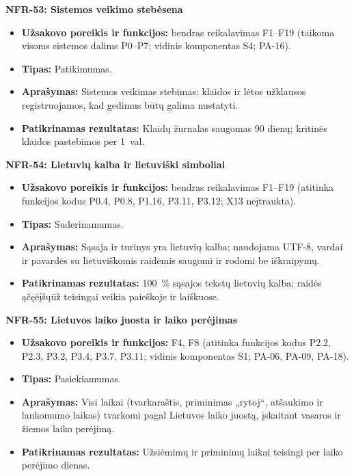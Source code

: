 \noindent\textbf{NFR-53: Sistemos veikimo stebėsena}
\begin{itemize}
    \item \textbf{Užsakovo poreikis ir funkcijos:} bendras reikalavimas F1--F19 (taikoma visoms sistemos dalims P0--P7; vidinis komponentas S4; PA-16).
    \item \textbf{Tipas:} Patikimumas.
    \item \textbf{Aprašymas:} Sistemos veikimas stebimas: klaidos ir lėtos užklausos registruojamos, kad gedimus būtų galima nustatyti.
    \item \textbf{Patikrinamas rezultatas:} Klaidų žurnalas saugomas 90 dienų; kritinės klaidos pastebimos per 1~val.
\end{itemize}

\noindent\textbf{NFR-54: Lietuvių kalba ir lietuviški simboliai}
\begin{itemize}
    \item \textbf{Užsakovo poreikis ir funkcijos:} bendras reikalavimas F1--F19 (atitinka funkcijos kodus P0.4, P0.8, P1.16, P3.11, P3.12; X13 neįtraukta).
    \item \textbf{Tipas:} Suderinamumas.
    \item \textbf{Aprašymas:} Sąsaja ir turinys yra lietuvių kalba; naudojama UTF-8, vardai ir pavardės su lietuviškomis raidėmis saugomi ir rodomi be iškraipymų.
    \item \textbf{Patikrinamas rezultatas:} 100~\% sąsajos tekstų lietuvių kalba; raidės ąčęėįšųūž teisingai veikia paieškoje ir laiškuose.
\end{itemize}

\noindent\textbf{NFR-55: Lietuvos laiko juosta ir laiko perėjimas}
\begin{itemize}
    \item \textbf{Užsakovo poreikis ir funkcijos:} F4, F8 (atitinka funkcijos kodus P2.2, P2.3, P3.2, P3.4, P3.7, P3.11; vidinis komponentas S1; PA-06, PA-09, PA-18).
    \item \textbf{Tipas:} Pasiekiamumas.
    \item \textbf{Aprašymas:} Visi laikai (tvarkaraštis, priminimas „rytoj“, atšaukimo ir lankomumo laikas) tvarkomi pagal Lietuvos laiko juostą, įskaitant vasaros ir žiemos laiko perėjimą.
    \item \textbf{Patikrinamas rezultatas:} Užsiėmimų ir priminimų laikai teisingi per laiko perėjimo dienas.
\end{itemize}